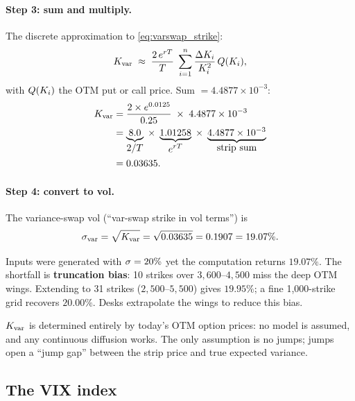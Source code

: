 \paragraph{Step 3: sum and multiply.}
The discrete approximation to \cref{eq:varswap_strike}:
\begin{equation}
  K_{\text{var}}
  \;\approx\;
  \frac{2\,e^{rT}}{T}\;
  \sum_{i=1}^{n}
    \frac{\Delta K_i}{K_i^2}\,Q(K_i),
  \label{eq:varswap_discrete}
\end{equation}
with $Q(K_i)$ the OTM put or call price. Sum
$=4.4877\times 10^{-3}$:
\begin{align*}
  K_{\text{var}}
  &= \frac{2 \times e^{0.0125}}{0.25}
     \;\times\; 4.4877 \times 10^{-3} \\
  &= \underbrace{8.0}_{\displaystyle 2/T}
     \;\times\;
     \underbrace{1.01258}_{\displaystyle e^{rT}}
     \;\times\;
     \underbrace{4.4877 \times 10^{-3}}_{\displaystyle \text{strip sum}} \\
  &= 0.03635.
\end{align*}

\paragraph{Step 4: convert to vol.}
The variance-swap vol (``var-swap strike in vol terms'') is
\[
  \sigma_{\text{var}} = \sqrt{K_{\text{var}}}
  = \sqrt{0.03635} = 0.1907 = 19.07\%.
\]

\begin{remark}
\label{rem:truncation}
Inputs were generated with $\sigma=20\%$ yet the computation returns
$19.07\%$. The shortfall is \textbf{truncation bias}: 10 strikes over
$3{,}600$--$4{,}500$ miss the deep OTM wings. Extending to 31 strikes
($2{,}500$--$5{,}500$) gives $19.95\%$; a fine 1{,}000-strike grid
recovers $20.00\%$. Desks extrapolate the wings to reduce this bias.
\end{remark}

\begin{keyfactbox}
$K_{\text{var}}$ is determined entirely by today's OTM option
prices: no model is assumed, and any continuous diffusion works. The only
assumption is no jumps; jumps open a ``jump gap'' between the strip
price and true expected variance.
\end{keyfactbox}

\subsection{The VIX index}
\label{subsec:vix}

